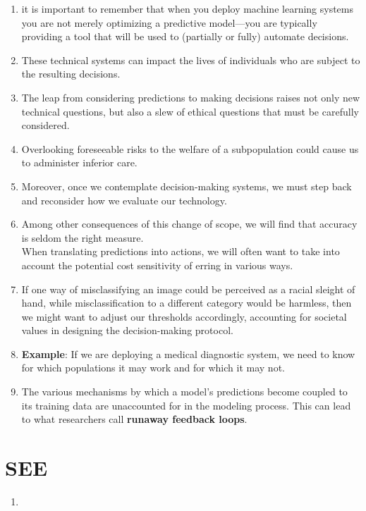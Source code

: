 \begin{enumerate}
    \item it is important to remember that when you deploy machine learning systems you are not merely optimizing a predictive model—you are typically providing a tool that will be used to (partially or fully) automate decisions. 
    
    \item These technical systems can impact the lives of individuals who are subject to the resulting decisions. 
    
    \item The leap from considering predictions to making decisions raises not only new technical questions, but also a slew of ethical questions that must be carefully considered.

    \item Overlooking foreseeable risks to the welfare of a subpopulation could cause us to administer inferior care. 
    
    \item Moreover, once we contemplate decision-making systems, we must step back and reconsider how we evaluate our technology. 
    
    \item Among other consequences of this change of scope, we will find that accuracy is seldom the right measure.\\
    When translating predictions into actions, we will often want to take into account the potential cost sensitivity of erring in various ways.

    \item If one way of misclassifying an image could be perceived as a racial sleight of hand, while misclassification to a different category would be harmless, then we might want to adjust our thresholds accordingly, accounting for societal values in designing the decision-making protocol.

    \item \textbf{Example}: If we are deploying a medical diagnostic system, we need to know for which populations it may work and for which it may not.

    \item The various mechanisms by which a model’s predictions become coupled to its training data are unaccounted for in the modeling process. This can lead to what researchers call \textbf{runaway feedback loops}.

    
\end{enumerate}




\section*{SEE}

\begin{enumerate}
    \item {}
\end{enumerate}








